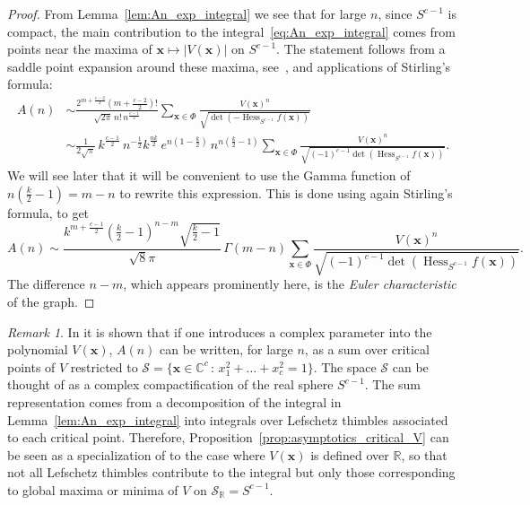 \documentclass[a4paper,oneside]{amsart}
\newcommand{\bb}[1]{\boldsymbol{#1}}
\numberwithin{theorem}{section}
\theoremstyle{remark}
\newtheorem{remark}[theorem]{Remark}
\newcommand{\R}{\mathbb{R}}
\newcommand{\C}{\mathbb{C}}
\DeclareMathOperator{\Hess}{Hess}
\begin{document}
\begin{proof}
  From Lemma~\ref{lem:An_exp_integral} we see that for large $n$, since $S^{c-1}$ is compact, the main contribution to the integral~\eqref{eq:An_exp_integral} comes from points near the maxima of $\bb{x}\mapsto |V(\bb{x})|$ on $S^{c-1}$. The statement follows from a saddle point expansion around these maxima, see~\cite[\S 4.6]{deBruijn2014asymptotic}, and applications of Stirling's formula:
  \begin{align*}
    A(n) & \sim \frac{2^{m + \frac{c-2}{2}} \left(m +\frac{c-2}{2}\right)!}{\sqrt{2\pi} \, n! \, n^{\frac{c-1}{2}}} \sum_{\bb{x}\in\Phi} \frac{V(\bb{x})^{n}}{\sqrt{\det(-\Hess_{S^{c-1}} f(\bb{x}))}} \\
    & \sim \frac{1}{2\sqrt{\pi}}
    \, k^{\frac{c-1}{2}}
    \, n^{-\frac{1}{2}}
    k^{\frac{nk}{2}}
    \, e^{n(1-\frac{k}{2})}
    \, n^{n(\frac{k}{2}-1)} \sum_{\bb{x}\in\Phi} \frac{V(\bb{x})^{n}}{\sqrt{(-1)^{c-1} \det(\Hess_{S^{c-1}} f(\bb{x}))}}.
  \end{align*}
  We will see later that it will be convenient to use the Gamma function of $n(\frac{k}{2}-1)=m-n$ to rewrite this expression.  
This is done using again Stirling's formula, to get
  \[
  A(n) \sim \frac{k^{m + \frac{c-1}{2}} \left(\frac{k}{2}-1\right)^{n-m}\sqrt{\frac{k}{2}-1}}{\sqrt{8}\pi}\, \Gamma\!\left(m-n \right) \sum_{\bb{x}\in\Phi} \frac{V(\bb{x})^{n}}{\sqrt{(-1)^{c-1} \det(\Hess_{S^{c-1}} f(\bb x))}}.
  \]
The difference $n-m$, which appears prominently here, is the \emph{Euler characteristic} of the graph.
\end{proof}

  \begin{remark}
    In \cite{LeeYang} it is shown that if one introduces a complex parameter into the polynomial $V(\bb{x})$, $A(n)$ can be written, for large $n$, as a sum over critical points of $V$ restricted to $\mathcal{S} = \{\bb{x}\in\C^c \,:\, x_1^2+\dots+x_c^2 = 1\}$. The space $\mathcal{S}$ can be thought of as a complex compactification of the real sphere $S^{c-1}$. 
    The sum representation comes from a decomposition of the integral in Lemma~\ref{lem:An_exp_integral} into integrals over Lefschetz thimbles associated to each critical point. Therefore, Proposition~\ref{prop:asymptotics_critical_V} can be seen as a specialization of \cite[Corollary 3.4]{LeeYang} to the case where $V(\bb{x})$ is defined over $\R$, so that not all Lefschetz thimbles contribute to the integral but only those corresponding to global maxima or minima of $V$ on $\mathcal{S}_{\R} = S^{c-1}$.
  \end{remark}
\end{document}
